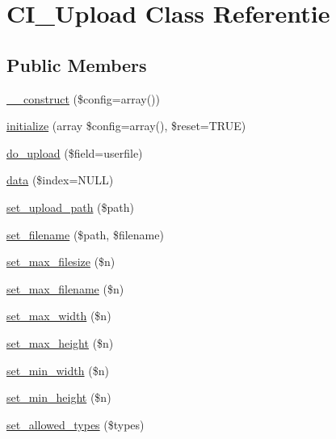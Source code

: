 \hypertarget{class_c_i___upload}{}\section{C\+I\+\_\+\+Upload Class Referentie}
\label{class_c_i___upload}
\subsection*{Public Members}
\begin{DoxyCompactItemize}
\item 
\mbox{\hyperlink{class_c_i___upload_af7f9493844d2d66e924e3c1df51ce616}{\+\_\+\+\_\+construct}} (\$config=array())
\item 
\mbox{\hyperlink{class_c_i___upload_a58cef448bae0c178f3f675700b7e4413}{initialize}} (array \$config=array(), \$reset=T\+R\+UE)
\item 
\mbox{\hyperlink{class_c_i___upload_a4cace770be6503a3563aae6cbb98086b}{do\+\_\+upload}} (\$field=\textquotesingle{}userfile\textquotesingle{})
\item 
\mbox{\hyperlink{class_c_i___upload_afe56c7645362202d2f1c7b8f7da67f39}{data}} (\$index=N\+U\+LL)
\item 
\mbox{\hyperlink{class_c_i___upload_ab2407f3a942d9b203f54e21194cf040d}{set\+\_\+upload\+\_\+path}} (\$path)
\item 
\mbox{\hyperlink{class_c_i___upload_a4b09b3f2b57a8bafcac1700f43d12c36}{set\+\_\+filename}} (\$path, \$filename)
\item 
\mbox{\hyperlink{class_c_i___upload_a1f78c3a54f32d313294b27cde4eafaf4}{set\+\_\+max\+\_\+filesize}} (\$n)
\item 
\mbox{\hyperlink{class_c_i___upload_aa288c7337b534788b32d66b23e25548e}{set\+\_\+max\+\_\+filename}} (\$n)
\item 
\mbox{\hyperlink{class_c_i___upload_a4028f187a825a666976cc3fe47cd44a8}{set\+\_\+max\+\_\+width}} (\$n)
\item 
\mbox{\hyperlink{class_c_i___upload_aaed82d431f5aeee6a0af294bc604a51e}{set\+\_\+max\+\_\+height}} (\$n)
\item 
\mbox{\hyperlink{class_c_i___upload_afe47751e024dc9bf07333060628e0fb4}{set\+\_\+min\+\_\+width}} (\$n)
\item 
\mbox{\hyperlink{class_c_i___upload_a72c6007605b27c92dfd83c6e21fe82e3}{set\+\_\+min\+\_\+height}} (\$n)
\item 
\mbox{\hyperlink{class_c_i___upload_a7c7ddfefedddc3fd625dd816d67c21bf}{set\+\_\+allowed\+\_\+types}} (\$types)

\end{DoxyCompactItemize}

